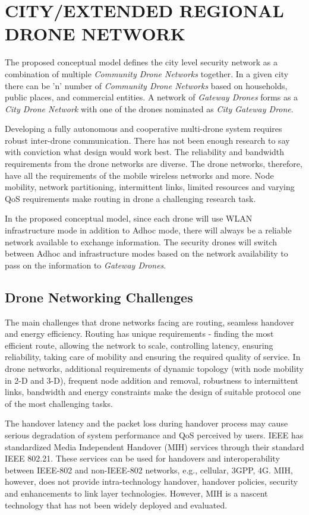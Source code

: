 \documentclass[sigconf]{acmart}
\begin{document}
\section{CITY/EXTENDED REGIONAL DRONE NETWORK}
The proposed conceptual model defines the city level security network as a combination of multiple \textit{Community Drone Networks} together. In a given city there can be 'n' number of \textit{Community Drone Networks} based on households, public places, and commercial entities. A network of \textit{Gateway Drones} forms as a \textit{City Drone Network} with one of the drones nominated as \textit{City Gateway Drone}.

Developing a fully autonomous and cooperative multi-drone system requires robust inter-drone communication\cite{Gupta2015}. There has not been enough research to say with conviction what design would work best\cite{Gupta2015}. The reliability and bandwidth requirements from the drone networks are diverse. The drone networks, therefore, have all the requirements of the mobile wireless networks and more. Node mobility, network partitioning, intermittent links, limited resources and varying QoS requirements make routing in drone a challenging research task\cite{Gupta2015}. 

In the proposed conceptual model, since each drone will use WLAN infrastructure mode in addition to Adhoc mode, there will always be a reliable network available to exchange  information. The security drones will switch between Adhoc and infrastructure modes based on the network availability to pass on the information to \textit{Gateway Drones}. 

\subsection{Drone Networking Challenges}
The main challenges that drone networks facing are routing, seamless handover and energy efficiency. 
Routing has unique requirements - finding the most efficient route, allowing the network to scale, controlling latency, ensuring reliability, taking care of mobility and ensuring the required quality of service. In drone networks, additional requirements of dynamic topology (with node mobility in 2-D and 3-D), frequent node addition and removal, robustness to intermittent links, bandwidth and energy constraints make the design of suitable protocol one of the most challenging tasks\cite{Gupta2015}. 

The handover latency and the packet loss during handover process may cause serious degradation of system performance and QoS perceived by users. IEEE has standardized Media Independent Handover (MIH) services through their standard IEEE 802.21. These services can be used for handovers and interoperability between IEEE-802 and non-IEEE-802 networks, e.g., cellular, 3GPP, 4G. MIH, however, does not provide intra-technology handover, handover policies, security and enhancements to link layer technologies. However, MIH is a nascent technology that has not been widely deployed and evaluated\cite{Gupta2015}.
\end{document}
